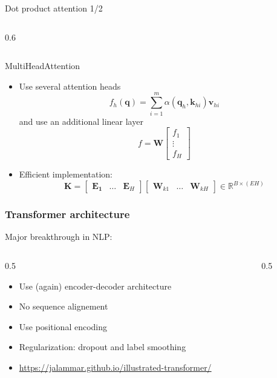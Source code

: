 \documentclass[pressentation,10pt,aspectratio=169,xcolor=table, colorlinks=true]{beamer}
\begin{document}
\begin{frame}{Dot product attention 1/2}
\begin{columns}
\begin{column}[t]{0.6\linewidth}
    \end{column}
    
  \end{columns}
  
\end{frame}



\begin{frame}{MultiHeadAttention}
  \begin{itemize}
  \item Use several attention heads
    \[f_h(\mathbf{q}) = \sum_{i=1}^m \alpha(\mathbf{q}_h, \mathbf{k}_{hi})\mathbf{v}_{hi}\]
    and use an additional linear layer
    \[f = \mathbf{W} 
    \begin{bmatrix}
      f_1\\
      \vdots\\
      f_H
    \end{bmatrix}
    \]
 
\item Efficient implementation:
  \[\mathbf{K} = \left[
  \begin{array}{c|c|c}
    \mathbf{E_1} & \ldots & \mathbf{E}_H
  \end{array}
  \right]
  \left[
  \begin{array}{c|c|c}
    \mathbf{W}_{k1} & \ldots & \mathbf{W}_{kH}
  \end{array}
    \right]
  \in \mathbb{R}^{B\times (EH)} \] 
   \end{itemize}
  
\end{frame}

\begin{frame}
  \frametitle{Transformer architecture}
  Major breakthrough in NLP: 
  \begin{columns}
    \begin{column}{0.5\linewidth}
      \begin{itemize}
      \item Use (again) encoder-decoder architecture
      \item No sequence alignement 
      \item Use positional encoding
      \item Regularization: dropout and label smoothing
      \item \url{https://jalammar.github.io/illustrated-transformer/}
      \end{itemize}
    \end{column}
    \begin{column}{0.5\linewidth}
      \begin{center}
        
      \end{center}
    \end{column}
  \end{columns}
  
\end{frame}
\end{document}
